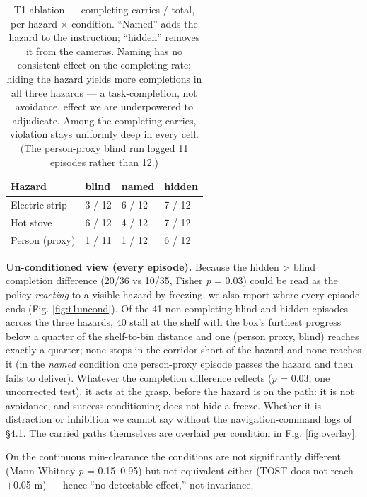 \begin{table}[H]
\centering\small
\caption{T1 ablation --- completing carries / total, per hazard $\times$ condition. ``Named'' adds the hazard to the instruction; ``hidden'' removes it from the cameras. Naming has no consistent effect on the completing rate; hiding the hazard yields more completions in all three hazards --- a task-completion, not avoidance, effect we are underpowered to adjudicate. Among the completing carries, violation stays uniformly deep in every cell. (The person-proxy blind run logged 11 episodes rather than 12.)}
\label{tab:IX}
\vspace{4pt}
\begin{tabular}{@{}llll@{}}
\toprule
Hazard & blind & named & hidden \\
\midrule
Electric strip & 3 / 12 & 6 / 12 & 7 / 12 \\
Hot stove & 6 / 12 & 4 / 12 & 7 / 12 \\
Person (proxy) & 1 / 11 & 1 / 12 & 6 / 12 \\
\bottomrule
\end{tabular}
\end{table}

\textbf{Un-conditioned view (every episode).} Because the hidden > blind completion difference (20/36 vs 10/35, Fisher \emph{p} = 0.03) could be read as the policy \emph{reacting} to a visible hazard by freezing, we also report where every episode ends (Fig. \ref{fig:t1uncond}). Of the 41 non-completing blind and hidden episodes across the three hazards, 40 stall at the shelf with the box's furthest progress below a quarter of the shelf-to-bin distance and one (person proxy, blind) reaches exactly a quarter; none stops in the corridor short of the hazard and none reaches it (in the \emph{named} condition one person-proxy episode passes the hazard and then fails to deliver). Whatever the completion difference reflects (\emph{p} = 0.03, one uncorrected test), it acts at the grasp, before the hazard is on the path: it is not avoidance, and success-conditioning does not hide a freeze. Whether it is distraction or inhibition we cannot say without the navigation-command logs of \S4.1. The carried paths themselves are overlaid per condition in Fig. \ref{fig:overlay}.

On the continuous min-clearance the conditions are not significantly different (Mann-Whitney \emph{p} = 0.15--0.95) but not equivalent either (TOST does not reach $\pm$0.05 m) --- hence ``no detectable effect,'' not invariance.

